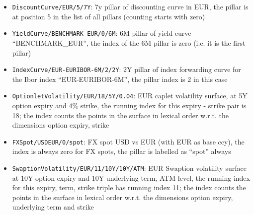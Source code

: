 \documentclass[12pt, a4paper]{article}
\begin{document}
\begin{itemize}
\item {\tt DiscountCurve/EUR/5/7Y}: 7y pillar of discounting curve in EUR, the pillar is at position 5 in the list of
  all pillars (counting starts with zero)
\item {\tt YieldCurve/BENCHMARK\_EUR/0/6M}: 6M pillar of yield curve ``BENCHMARK\_EUR'', the index of the 6M pillar is
  zero (i.e. it is the first pillar)
\item {\tt IndexCurve/EUR-EURIBOR-6M/2/2Y}: 2Y pillar of index forwarding curve for the Ibor index ``EUR-EURIBOR-6M'',
  the pillar index is 2 in this case
\item {\tt OptionletVolatility/EUR/18/5Y/0.04}: EUR caplet volatility surface, at 5Y option expiry and $4\%$ strike, the
  running index for this expiry - strike pair is 18; the index counts the points in the surface in lexical order
  w.r.t. the dimensions option expiry, strike
\item {\tt FXSpot/USDEUR/0/spot}: FX spot USD vs EUR (with EUR as base ccy), the index is always zero for FX spots, the
  pillar is labelled as ``spot'' always
\item {\tt SwaptionVolatility/EUR/11/10Y/10Y/ATM}: EUR Swaption volatility surface at 10Y option expiry and 10Y
  underlying term, ATM level, the running index for this expiry, term, strike triple has running index 11; the index
  counts the points in the surface in lexical order w.r.t. the dimensions option expiry, underlying term and strike
\end{itemize}
\end{document}
